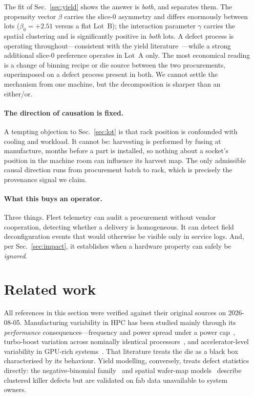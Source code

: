 \documentclass[10pt,conference]{IEEEtran}
\begin{document}
The fit of Sec.~\ref{sec:yield} shows the answer is \emph{both}, and separates them. The
propensity vector $\beta$ carries the slice-0 asymmetry and differs enormously between lots
($\beta_0=+2.51$ versus a flat Lot~B); the interaction parameter $\gamma$ carries the spatial
clustering and is significantly positive in \emph{both} lots. A defect process is operating
throughout---consistent with the yield literature~\cite{koren1993negbinom,bae2007waferyield}---while
a strong additional slice-0 preference operates in Lot~A only. The most economical reading is a
change of binning recipe or die source between the two procurements, superimposed on a defect
process present in both. We cannot settle the mechanism from one machine, but the decomposition is
sharper than an either/or.

\paragraph{The direction of causation is fixed.} A tempting objection to Sec.~\ref{sec:lot} is that
rack position is confounded with cooling and workload. It cannot be: harvesting is performed by
fusing at manufacture, months before a part is installed, so nothing about a socket's position in
the machine room can influence its harvest map. The only admissible causal direction runs from
procurement batch to rack, which is precisely the provenance signal we claim.

\paragraph{What this buys an operator.} Three things. Fleet telemetry can audit a procurement
without vendor cooperation, detecting whether a delivery is homogeneous. It can detect field
deconfiguration events that would otherwise be visible only in service logs. And, per
Sec.~\ref{sec:impact}, it establishes when a hardware property can safely be \emph{ignored}.

\section{Related work}
All references in this section were verified against their original sources on 2026-08-05.
Manufacturing variability in HPC has been studied mainly through its
\emph{performance} consequences---frequency and power spread under a power
cap~\cite{inadomi2015variation}, turbo-boost variation across nominally identical
processors~\cite{acun2016variation}, and accelerator-level variability in GPU-rich
systems~\cite{sinha2022gpuvariability}. That literature treats the die as a black box
characterised by its behaviour. Yield modelling, conversely, treats defect statistics directly:
the negative-binomial family~\cite{koren1993negbinom} and spatial wafer-map
models~\cite{bae2007waferyield} describe clustered killer defects but are validated on
fab data unavailable to system owners.
\end{document}
